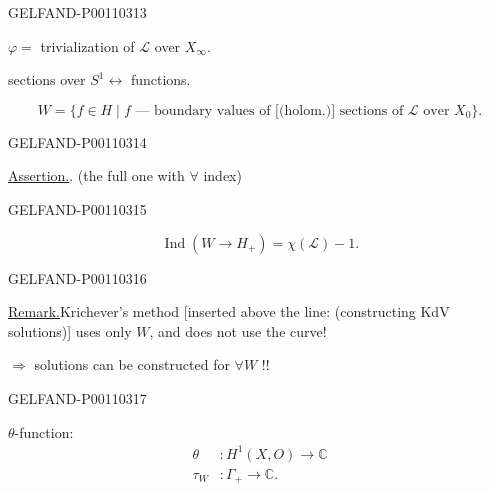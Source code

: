 \begin{GelfandAdjacentEvidence}{GELFAND-P001103}{13}


$\varphi=$ trivialization of $\mathcal L$ over $X_\infty$.

sections over $S^1\leftrightarrow$ functions.

\[
W=\{f\in H\mid f\text{ — boundary values of [(holom.)] sections of }
\mathcal L\text{ over }X_0\}.
\]
\end{GelfandAdjacentEvidence}
\begin{GelfandAdjacentEvidence}{GELFAND-P001103}{14}


\underline{Assertion.}\quad {}. (the full one with $\forall$ index)
\end{GelfandAdjacentEvidence}
\begin{GelfandAdjacentEvidence}{GELFAND-P001103}{15}

\[
\operatorname{Ind}(W\longrightarrow H_+)=\chi(\mathcal L)-1.
\]
\end{GelfandAdjacentEvidence}
\begin{GelfandAdjacentEvidence}{GELFAND-P001103}{16}


\underline{Remark.}\quad Krichever’s method [inserted above the line: (constructing KdV solutions)]
uses only $W$, and does not use the curve!

$\Rightarrow$ solutions can be constructed for $\forall W$ !!
\end{GelfandAdjacentEvidence}
\begin{GelfandAdjacentEvidence}{GELFAND-P001103}{17}


$\theta$-function:
\[
\begin{aligned}
\theta&:H^1(X,O)\longrightarrow\mathbb C\\
\tau_W&:\Gamma_+\longrightarrow\mathbb C.
\end{aligned}
\]
\end{GelfandAdjacentEvidence}



